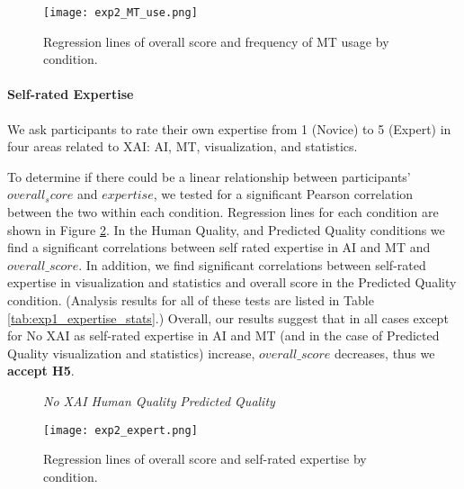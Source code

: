 \begin{figure}[h!]
    \centering
    \texttt{[image: exp2\_MT\_use.png]}
    \caption{Regression lines of overall score and frequency of MT usage by condition.}
    \label{fig:exp_MT_use}
\end{figure}

\paragraph{Self-rated Expertise}

We ask participants to rate their own expertise from 1 (Novice) to 5 (Expert) in four areas related to XAI: AI, MT, visualization, and statistics. 

To determine if there could be a linear relationship between participants' $overall_score$ and $expertise$, we tested for a significant Pearson correlation between the two within each condition. Regression lines for each condition are shown in Figure \ref{fig:exp_expert}.
In the Human Quality, and Predicted Quality conditions we find a significant correlations between self rated expertise in AI and MT and $overall\_score$. In addition, we find significant correlations between self-rated expertise in visualization and statistics and overall score in the Predicted Quality condition.  
(Analysis results for all of these tests are listed in Table \ref{tab:exp1_expertise_stats}.) Overall, our results suggest that in all cases except for No XAI as self-rated expertise in AI and MT (and in the case of Predicted Quality visualization and statistics) increase, $overall\_score$ decreases, thus we \textbf{accept H5}.

\begin{figure}[h!]
    \centering
    
     \textit{No XAI} \quad
     \textit{Human Quality} \quad
     \textit{Predicted Quality} \quad
    
    \texttt{[image: exp2\_expert.png]}
    \caption{Regression lines of overall score and self-rated expertise by condition.}
    \label{fig:exp_expert}
\end{figure}

